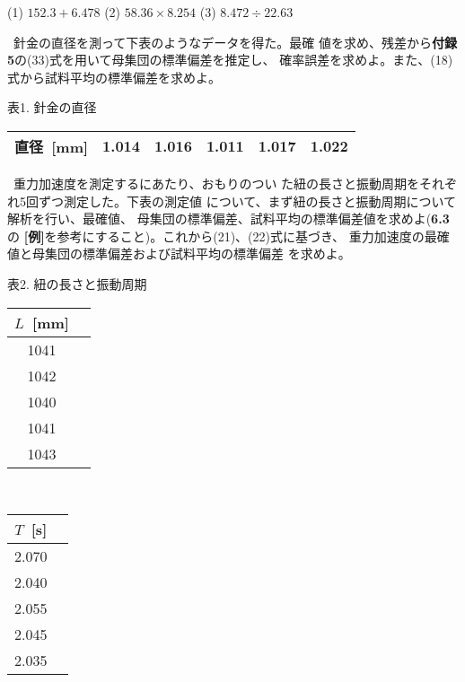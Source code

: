 \documentclass[11pt,a4,epsf]{jarticle}
\begin{document}
\bigskip

(1) $152.3 + 6.478$  \hspace{1cm} (2) $58.36 \times 8.254$  
\hspace{1cm} (3) $8.472 \div 22.63$

\bigskip

\noindent {\bf [問題7]}~針金の直径を測って下表のようなデータを得た。最確
値を求め、残差から{\bf 付録5}の(33)式を用いて母集団の標準偏差を推定し、
確率誤差を求めよ。また、(18)式から試料平均の標準偏差を求めよ。

\begin{center}

表1. 針金の直径

\vspace{0.2cm}
\begin{tabular}{|c|c|c|c|c|c|} \hline
直径~[mm] & 1.014 & 1.016 & 1.011 & 1.017 & 1.022  \\  
\hline
\end{tabular}
\end{center}

\newpage

\noindent {\bf [問題8]}~重力加速度を測定するにあたり、おもりのつい
た紐の長さと振動周期をそれぞれ5回ずつ測定した。下表の測定値
について、まず紐の長さと振動周期について解析を行い、最確値、
母集団の標準偏差、試料平均の標準偏差値を求めよ({\bf 6.3}の
{\bf [例]}を参考にすること)。これから(21)、(22)式に基づき、
重力加速度の最確値と母集団の標準偏差および試料平均の標準偏差
を求めよ。

\begin{center}

表2. 紐の長さと振動周期

\vspace{0.2cm}
\begin{tabular}{|c|c|} \hline
$L$~[mm]  \\ \hline
1041      \\ \hline
1042       \\ \hline
1040       \\ \hline
1041       \\ \hline
1043       \\ \hline
\end{tabular}\ \ \ \ \ 
\begin{tabular}{|c|c|} \hline
 $T$~[s] \\ \hline
 2.070    \\ \hline
 2.040    \\ \hline
 2.055    \\ \hline
 2.045    \\ \hline
 2.035    \\ \hline
\end{tabular}
\end{center}
\end{document}
